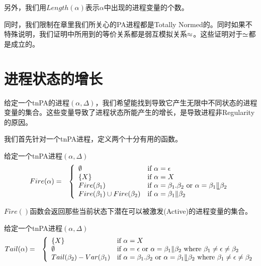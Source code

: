 另外，我们用$Length(\alpha)$表示$\alpha$中出现的进程变量的个数。

同时，我们限制在章里我们所关心的PA进程都是Totally Normed的。同时如果不特殊说明，我们证明中所用到的等价关系都是弱互模拟关系$\approx$。这些证明对于$\simeq$都是成立的。

\section{进程状态的增长}
\label{sec:grow-prop}

给定一个tnPA的进程$(\alpha,\Delta)$，我们希望能找到导致它产生无限中不同状态的进程变量的集合。这些变量导致了进程状态所能产生的增长，是导致进程非Regularity的原因。

我们首先针对一个tnPA进程，定义两个十分有用的函数。

\begin{defn}[Fire 函数]\label{def:fire}
给定一个tnPA进程$(\alpha,\Delta)$
\begin{eqnarray*}
Fire(\alpha) &=& \left\{ \begin{array}{ll}
\emptyset & \mbox{if }\alpha=\epsilon\\
\{X\} & \mbox{if }\alpha=X\\
Fire(\beta_1) & \mbox{if }\alpha=\beta_1.\beta_2\mbox{ or }\alpha=\beta_1\llfloor\beta_2\\
Fire(\beta_1)\cup Fire(\beta_2) & \mbox{if }\alpha=\beta_1\|\beta_2
\end{array}\right.
\end{eqnarray*}
\end{defn}

$Fire()$函数会返回那些当前状态下潜在可以被激发(Active)的进程变量的集合。

\begin{defn}[Tail 函数]\label{def:tail}
给定一个tnPA进程$(\alpha,\Delta)$
\begin{eqnarray*}
Tail(\alpha) &=& \left\{ \begin{array}{ll}
\{X\} & \mbox{if }\alpha=X\\
\emptyset & \mbox{if }\alpha=\epsilon \mbox{ or } \alpha=\beta_1\|\beta_2 \mbox{ where } \beta_1\neq\epsilon\neq\beta_2\\
Tail(\beta_2)-Var(\beta_1) &\mbox{if }\alpha=\beta_1.\beta_2 \mbox{ or }\alpha=\beta_1\llfloor\beta_2\mbox{ where }\beta_1\neq\epsilon\neq\beta_2
\end{array}\right.
\end{eqnarray*}
\end{defn}

